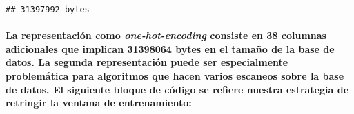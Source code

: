 \documentclass[]{article}
\let\oldparagraph\paragraph
\renewcommand{\paragraph}[1]{\oldparagraph{#1}\mbox{}}
\begin{document}
\begin{verbatim}
## 31397992 bytes
\end{verbatim}

\paragraph{\texorpdfstring{La representación como
\emph{one-hot-encoding} consiste en 38 columnas adicionales que implican
31398064 bytes en el tamaño de la base de datos. La segunda
representación puede ser especialmente problemática para algoritmos que
hacen varios escaneos sobre la base de datos. El siguiente bloque de
código se refiere nuestra estrategia de retringir la ventana de
entrenamiento:}{La representación como one-hot-encoding consiste en 38 columnas adicionales que implican 31398064 bytes en el tamaño de la base de datos. La segunda representación puede ser especialmente problemática para algoritmos que hacen varios escaneos sobre la base de datos. El siguiente bloque de código se refiere nuestra estrategia de retringir la ventana de entrenamiento:}}\label{la-representacion-como-one-hot-encoding-consiste-en-38-columnas-adicionales-que-implican-31398064-bytes-en-el-tamano-de-la-base-de-datos.-la-segunda-representacion-puede-ser-especialmente-problematica-para-algoritmos-que-hacen-varios-escaneos-sobre-la-base-de-datos.-el-siguiente-bloque-de-codigo-se-refiere-nuestra-estrategia-de-retringir-la-ventana-de-entrenamiento}
\end{document}
